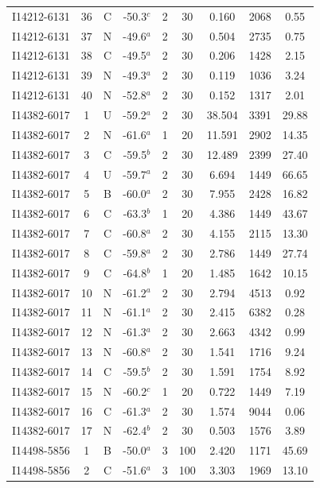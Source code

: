 \begin{table}
\begin{tabular}{ccccccccc}
I14212-6131 & 36 & C & -50.3$^{c}$ & 2 & 30 & 0.160 & 2068 & 0.55 \\
I14212-6131 & 37 & N & -49.6$^{a}$ & 2 & 30 & 0.504 & 2735 & 0.75 \\
I14212-6131 & 38 & C & -49.5$^{a}$ & 2 & 30 & 0.206 & 1428 & 2.15 \\
I14212-6131 & 39 & N & -49.3$^{a}$ & 2 & 30 & 0.119 & 1036 & 3.24 \\
I14212-6131 & 40 & N & -52.8$^{a}$ & 2 & 30 & 0.152 & 1317 & 2.01 \\
I14382-6017 & 1 & U & -59.2$^{a}$ & 2 & 30 & 38.504 & 3391 & 29.88 \\
I14382-6017 & 2 & N & -61.6$^{a}$ & 1 & 20 & 11.591 & 2902 & 14.35 \\
I14382-6017 & 3 & C & -59.5$^{b}$ & 2 & 30 & 12.489 & 2399 & 27.40 \\
I14382-6017 & 4 & U & -59.7$^{a}$ & 2 & 30 & 6.694 & 1449 & 66.65 \\
I14382-6017 & 5 & B & -60.0$^{a}$ & 2 & 30 & 7.955 & 2428 & 16.82 \\
I14382-6017 & 6 & C & -63.3$^{b}$ & 1 & 20 & 4.386 & 1449 & 43.67 \\
I14382-6017 & 7 & C & -60.8$^{a}$ & 2 & 30 & 4.155 & 2115 & 13.30 \\
I14382-6017 & 8 & C & -59.8$^{a}$ & 2 & 30 & 2.786 & 1449 & 27.74 \\
I14382-6017 & 9 & C & -64.8$^{b}$ & 1 & 20 & 1.485 & 1642 & 10.15 \\
I14382-6017 & 10 & N & -61.2$^{a}$ & 2 & 30 & 2.794 & 4513 & 0.92 \\
I14382-6017 & 11 & N & -61.1$^{a}$ & 2 & 30 & 2.415 & 6382 & 0.28 \\
I14382-6017 & 12 & N & -61.3$^{a}$ & 2 & 30 & 2.663 & 4342 & 0.99 \\
I14382-6017 & 13 & N & -60.8$^{a}$ & 2 & 30 & 1.541 & 1716 & 9.24 \\
I14382-6017 & 14 & C & -59.5$^{b}$ & 2 & 30 & 1.591 & 1754 & 8.92 \\
I14382-6017 & 15 & N & -60.2$^{c}$ & 1 & 20 & 0.722 & 1449 & 7.19 \\
I14382-6017 & 16 & C & -61.3$^{a}$ & 2 & 30 & 1.574 & 9044 & 0.06 \\
I14382-6017 & 17 & N & -62.4$^{b}$ & 2 & 30 & 0.503 & 1576 & 3.89 \\
I14498-5856 & 1 & B & -50.0$^{a}$ & 3 & 100 & 2.420 & 1171 & 45.69 \\
I14498-5856 & 2 & C & -51.6$^{a}$ & 3 & 100 & 3.303 & 1969 & 13.10 \\

\end{tabular}
\end{table}

